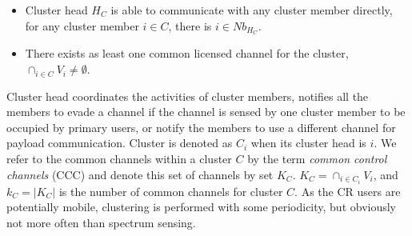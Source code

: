 \begin{itemize}
\item Cluster head $H_C$ is able to communicate with any cluster member directly, \ie for any cluster member $i\in C$, there is $i\in Nb_{H_C}$.
\item There exists as least one common licensed channel for the cluster, \ie $\cap_{i\in C} V_i \neq \emptyset$.
\end{itemize}
Cluster head coordinates the activities of cluster members, \ie notifies all the members to evade a channel if the channel is sensed by one cluster member to be occupied by primary users, or notify the members to use a different channel for payload communication. 
Cluster is denoted as $C_i$ when its cluster head is $i$.
We refer to the common channels within a cluster $C$ by the term \textit{common control channels} (\gls{CCC}) and denote this set of channels by set $K_C$.
$ K_C = \cap_{i\in C_i} V_i$, and $k_C = |K_C|$ is the number of common channels for cluster $C$.
As the CR users are potentially mobile, clustering is performed with some periodicity, but obviously not more often than spectrum sensing.










